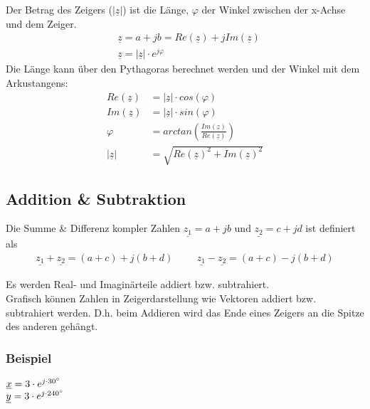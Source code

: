 \newpage

Der Betrag des Zeigers ($|\underline{z}|$) ist die Länge, $\varphi$ der Winkel zwischen der x-Achse und dem Zeiger.
\begin{align}
    &\underline{z}=a+jb=Re(\underline{z})+j Im(\underline{z})   \\
    &\underline{z}=|\underline{z}|\cdot e^{j\varphi}
\end{align}
Die Länge kann über den Pythagoras berechnet werden und der Winkel mit dem Arkustangens:
\begin{align}
    Re(\underline{z})&=|\underline{z}|\cdot cos(\varphi)                \\
    Im(\underline{z})&=|\underline{z}|\cdot sin(\varphi)                \\
    \varphi&=arctan(\frac{Im(\underline{z})}{Re(\underline{z})})        \\
    |\underline{z}|&=\sqrt{Re(\underline{z})^{2}+Im(\underline{z})^{2}}
\end{align}

\vspace{1cm}

\subsection{Addition \& Subtraktion}
Die Summe \& Differenz kompler Zahlen $\underline{z_1}=a+jb$ und $\underline{z_2}=c+jd$ ist definiert als
\begin{align}
    \underline{z_1} + \underline{z_2} = (a+c) + j(b+d) \hspace{1cm} \underline{z_1} - \underline{z_2} = (a+c) - j(b+d)
\end{align}

Es werden Real- und Imaginärteile addiert bzw. subtrahiert.\\

Grafisch können Zahlen in Zeigerdarstellung wie Vektoren addiert bzw. subtrahiert werden. D.h. beim Addieren wird das Ende eines Zeigers an die Spitze des anderen gehängt.\\

\vspace{1cm}

\subsubsection*{Beispiel}
$\underline{x} = 3 \cdot e^{j \cdot 30\degree}$ \\
$\underline{y} = 3 \cdot e^{j \cdot 240\degree}$ \\

